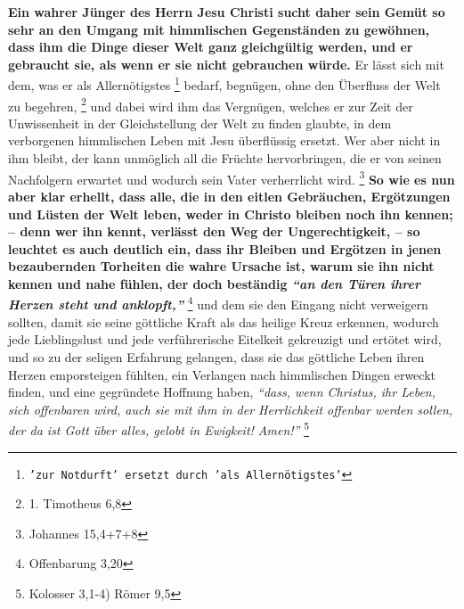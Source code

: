 \textbf{Ein wahrer Jünger des Herrn Jesu Christi sucht daher sein Gemüt so sehr an den
Umgang mit himmlischen Gegenständen zu gewöhnen, dass ihm die Dinge dieser Welt
ganz gleichgültig werden, und er gebraucht sie, als wenn er sie nicht
gebrauchen würde.} Er lässt sich mit dem, was er als Allernötigstes \footnote{\texttt{'zur Notdurft' ersetzt durch 'als Allernötigstes'}} bedarf, begnügen, ohne
den Überfluss der Welt zu begehren,
\footnote{1. Timotheus 6,8}
und dabei wird ihm das
Vergnügen, welches er zur Zeit der Unwissenheit in der Gleichstellung der Welt
zu finden glaubte, in dem verborgenen himmlischen Leben mit Jesu überflüssig
ersetzt. Wer aber nicht in ihm bleibt, der kann unmöglich all die Früchte
hervorbringen, die er von seinen Nachfolgern erwartet und wodurch sein Vater
verherrlicht wird.
\footnote{Johannes 15,4+7+8}
\textbf{So wie es nun aber klar erhellt,
dass alle, die in den eitlen Gebräuchen, Ergötzungen und Lüsten der Welt leben,
weder in Christo bleiben noch ihn kennen; -- denn wer ihn kennt, verlässt den Weg
der Ungerechtigkeit, -- so leuchtet es auch deutlich ein, dass ihr Bleiben und
Ergötzen in jenen bezaubernden Torheiten die wahre Ursache ist, warum sie ihn
nicht kennen und nahe fühlen, der doch beständig
\textit{"`an den Türen ihrer Herzen
steht und anklopft,"'}}
\footnote{Offenbarung 3,20}
und dem sie den Eingang nicht
verweigern sollten, damit sie seine göttliche Kraft als das heilige Kreuz
erkennen, wodurch jede Lieblingslust und jede verführerische Eitelkeit
gekreuzigt und ertötet wird, und so zu der seligen Erfahrung gelangen, dass sie
das göttliche Leben ihren Herzen emporsteigen fühlten, ein Verlangen nach
himmlischen Dingen erweckt finden, und eine gegründete Hoffnung haben,
\textit{"`dass,
wenn Christus, ihr Leben, sich offenbaren wird, auch sie mit ihm in der
Herrlichkeit offenbar werden sollen, der da ist Gott über alles, gelobt in
Ewigkeit! Amen!"'}
\footnote{Kolosser 3,1-4) Römer 9,5}

